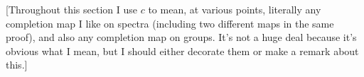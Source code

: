 \documentclass{MetricNotes2023}
\newcommand{\xsurj}[2][]{%
  \xrightarrow[#1]{#2}\mathrel{\mkern-14mu}\rightarrow
}
\begin{document}
[Throughout this section I use \(c\) to mean, at various points, literally any completion map I like on spectra (including two different maps in the same proof), and also any completion map on groups. It's not a huge deal because it's obvious what I mean, but I should either decorate them or make a remark about this.]


\end{document}
